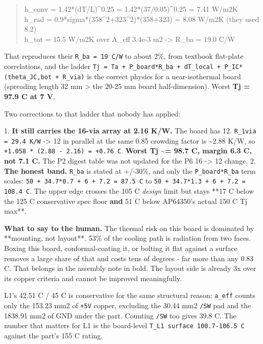 \documentclass[11pt,a4paper]{article}
\begin{document}
\begin{quote}\small\ttfamily\raggedright
h\_conv = 1.42{*}(dT/L)\textasciicircum{}0.25 = 1.42{*}(37/0.05)\textasciicircum{}0.25            = 7.41 W/m2K\\
h\_rad  = 0.9{*}sigma{*}(358\textasciicircum{}2+323\textasciicircum{}2){*}(358+323)                 = 8.08 W/m2K   (they used 8.2)\\
h\_tot  = 15.5 W/m2K over A\_eff 3.4e-3 m2  -\textgreater{}  R\_ba         = 19.0 C/W
\end{quote}
That reproduces their \texttt{R\_ba = 19 C/W} to about 2\%, from textbook flat-plate correlations, and the ladder \texttt{Tj = Ta + P\_board{*}R\_ba + dT\_local + P\_IC{*}(theta\_JC,bot + R\_via)} is the correct physics for a near-isothermal board (spreading length 32 mm \textgreater{} the 20-25 mm board half-dimension). Worst \textbf{Tj = 97.9 C at 7 V}.

Two corrections to that ladder that nobody has applied:

1. \textbf{It still carries the 16-via array at 2.16 K/W.} The board has 12. \texttt{R\_1via = 29.4 K/W} -\textgreater{} 12 in parallel at the same 0.85 crowding factor is \textasciitilde{}2.88 K/W, so \texttt{+1.058 {*} (2.88 - 2.16) = +0.76 C}. \textbf{Worst Tj \textasciitilde{}= 98.7 C, margin 6.3 C, not 7.1 C.} The P2 digest table was not updated for the P6 16 -\textgreater{} 12 change. 2. \textbf{The honest band.} \texttt{R\_ba} is stated at +/-30\%, and only the \texttt{P\_board{*}R\_ba} term scales: \texttt{50 + 34.7{*}0.7 + 6 + 7.2 = 87.5 C} to \texttt{50 + 34.7{*}1.3 + 6 + 7.2 = 108.4 C}. The upper edge crosses the 105 C \emph{design} limit but stays {*}{*}17 C below the 125 C conservative spec floor\textbf{ and }51 C below AP64350's actual 150 C Tj max{*}{*}.

\textbf{What to say to the human.} The thermal risk on this board is dominated by {*}{*}mounting, not layout{*}{*}. 53\% of the cooling path is radiation from two faces. Boxing this board, conformal-coating it, or bolting it flat against a surface removes a large share of that and costs tens of degrees - far more than any 0.83 C. That belongs in the assembly note in bold. The layout side is already 3x over its copper criteria and cannot be improved meaningfully.

L1's 42.51 C / 45 C is conservative for the same structural reason: \texttt{a\_eff} counts only the 153.23 mm2 of \texttt{+5V} copper, excluding the 30.44 mm2 \texttt{/SW} pad and the 1838.91 mm2 of GND under the part. Counting \texttt{/SW} too gives 39.8 C. The number that matters for L1 is the board-level \texttt{T\_L1 surface 100.7-106.5 C} against the part's 155 C rating.
\end{document}
